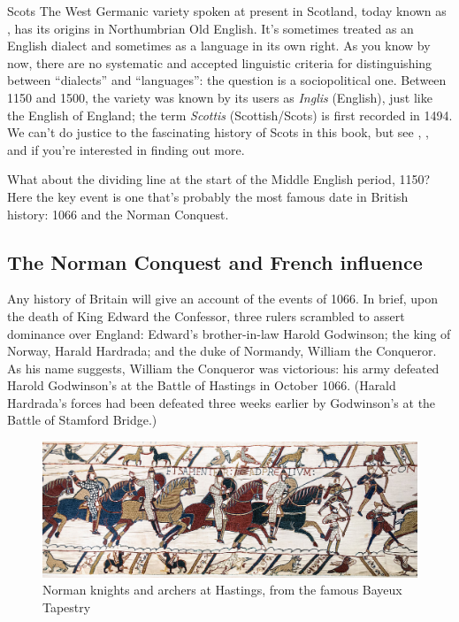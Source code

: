 \begin{varietybox}{Scots}
The West Germanic variety spoken at present in Scotland, today known as , has its origins in Northumbrian Old English. It's sometimes treated as an English dialect and sometimes as a language in its own right. As you know by now, there are no systematic and accepted linguistic criteria for distinguishing between ``dialects'' and ``languages'': the question is a sociopolitical one. Between 1150 and 1500, the variety was known by its users as \emph{Inglis} (English), just like the English of England; the term \emph{Scottis} (Scottish/Scots) is first recorded in 1494. We can't do justice to the fascinating history of Scots in this book, but see \citet{Jones1997}, \citet{Smith2012}, and \citet[Chapter 3]{Millar2012} if you're interested in finding out more.
\end{varietybox}


\noindent What about the dividing line at the start of the Middle English period, 1150? Here the key event is one that's probably the most famous date in British history: 1066 and the Norman Conquest.

\subsection{The Norman Conquest and French influence}\label{ME-french}

Any history of Britain will give an account of the events of 1066. In brief, upon the death of King Edward the Confessor, three rulers scrambled to assert dominance over England: Edward's brother-in-law Harold Godwinson; the king of Norway, Harald Hardrada; and the duke of Normandy, William the Conqueror. As his name suggests, William the Conqueror was victorious: his army defeated Harold Godwinson's at the Battle of Hastings in October 1066. (Harald Hardrada's forces had been defeated three weeks earlier by Godwinson's at the Battle of Stamford Bridge.)

\begin{figure}
    \includegraphics[scale=1.15]{chapters/img/1280px-Bayeux_Tapestry_scene51_Battle_of_Hastings_Norman_knights_and_archers.jpg}
    \caption{Norman knights and archers at Hastings, from the famous Bayeux Tapestry}
    \label{fig:ME_Hastings}
\end{figure}

